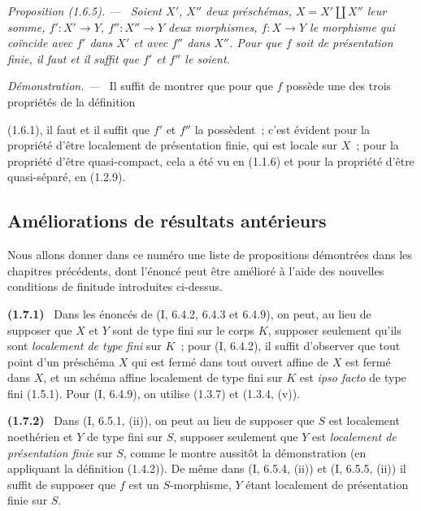 \documentclass[10pt,oneside]{book}
\makeatletter
\newcommand{\setmanualcurrentlabel}[1]{\def\@currentlabel{#1}}
\newcommand{\oldpage}[2][]{%
  \setcounter{footnote}{0}%
  \marginpar{\scriptsize\textbf{#1}~|~#2}\ignorespaces}
\newenvironment{env}[1][]{\setmanualcurrentlabel{#1}\par\medskip\noindent\textbf{(#1)}\ }{\par}
\newenvironment{proposition}[1][]{%
  \setmanualcurrentlabel{#1}\par\medskip\noindent\itshape Proposition (#1). ---\ }{\par}
\newenvironment{proof}{%
  \par\medskip\noindent\textit{Démonstration. ---\ }}{\par}
\makeatother
\begin{document}
\begin{proposition}[1.6.5]
\label{IV.1.6.5-fr}
Soient $X'$, $X''$ deux préschémas, $X=X'\amalg X''$ leur somme,
$f':X'\to Y$, $f'':X''\to Y$ deux morphismes, $f:X\to Y$ le morphisme qui
coïncide avec $f'$ dans $X'$ et avec $f''$ dans $X''$. Pour que $f$ soit de
présentation finie, il faut et il suffit que $f'$ et $f''$ le soient.
\end{proposition}

\par\medskip\noindent
\begin{proof}
Il suffit de montrer que pour que $f$ possède une des trois propriétés de la
définition

\oldpage[IV-1]{236}

(1.6.1), il faut et il suffit que $f'$ et $f''$ la possèdent~; c'est évident
pour la propriété d'être localement de présentation finie, qui est locale sur
$X$~; pour la propriété d'être quasi-compact, cela a été vu en (1.1.6) et pour
la propriété d'être quasi-séparé, en (1.2.9).
\end{proof}

\subsection{Améliorations de résultats antérieurs}
\label{subsection:IV.1.7-fr}

Nous allons donner dans ce numéro une liste de propositions démontrées dans
les chapitres précédents, dont l'énoncé peut être amélioré à l'aide des
nouvelles conditions de finitude introduites ci-dessus.

\begin{env}[1.7.1]
\label{IV.1.7.1-fr}
Dans les énoncés de (I, 6.4.2, 6.4.3 et 6.4.9), on peut, au lieu de supposer
que $X$ et $Y$ sont de type fini sur le corps $K$, supposer seulement qu'ils
sont \emph{localement de type fini} sur $K$~; pour (I, 6.4.2), il suffit
d'observer que tout point d'un préschéma $X$ qui est fermé dans tout ouvert
affine de $X$ est fermé dans $X$, et un schéma affine localement de type fini
sur $K$ est \emph{ipso facto} de type fini (1.5.1). Pour (I, 6.4.9), on utilise
(1.3.7) et (1.3.4, (v)).
\end{env}

\begin{env}[1.7.2]
\label{IV.1.7.2-fr}
Dans (I, 6.5.1, (ii)), on peut au lieu de supposer que $S$ est localement
noethérien et $Y$ de type fini sur $S$, supposer seulement que $Y$ est
\emph{localement de présentation finie} sur $S$, comme le montre aussitôt la
démonstration (en appliquant la définition (1.4.2)). De même dans (I, 6.5.4,
(ii)) et (I, 6.5.5, (ii)) il suffit de supposer que $f$ est un $S$-morphisme,
$Y$ étant localement de présentation finie sur $S$.
\end{env}
\end{document}
